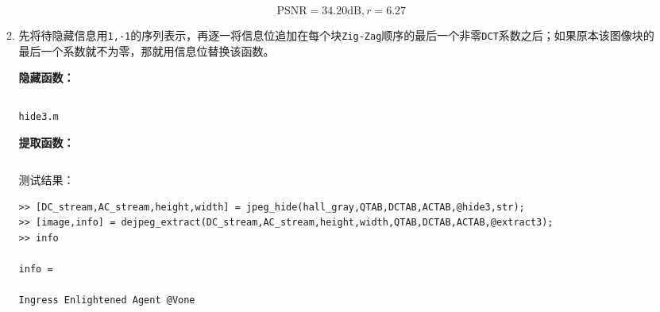 \documentclass{article}
\numberwithin{figure}{section}
\numberwithin{table}{section}
\numberwithin{listing}{section}
\numberwithin{equation}{section}
\begin{document}
\begin{enumerate}
\begin{enumerate}
                        $$\textrm{PSNR}=34.20\textrm{dB}, r=6.27$$

                    \item 先将待隐藏信息用\texttt{1,-1}的序列表示，再逐一将信息位追加在每个块\texttt{Zig-Zag}顺序的最后一个非零\texttt{DCT}系数之后；如果原本该图像块的最后一个系数就不为零，那就用信息位替换该函数。

                        \textbf{隐藏函数：}
                        \begin{listing}[H]
                            \inputminted{matlab}{../hide3.m}
                            \caption{\texttt{hide3.m}}
                        \end{listing}

                        \textbf{提取函数：}
                        \inputminted{matlab}{../extract3.m}
                        \begingroup
                        \endgroup

                        测试结果：

                        \begin{verbatim}
>> [DC_stream,AC_stream,height,width] = jpeg_hide(hall_gray,QTAB,DCTAB,ACTAB,@hide3,str);
>> [image,info] = dejpeg_extract(DC_stream,AC_stream,height,width,QTAB,DCTAB,ACTAB,@extract3);
>> info

info =

Ingress Enlightened Agent @Vone 
                        \end{verbatim}


\end{enumerate}
\end{enumerate}
\end{document}
